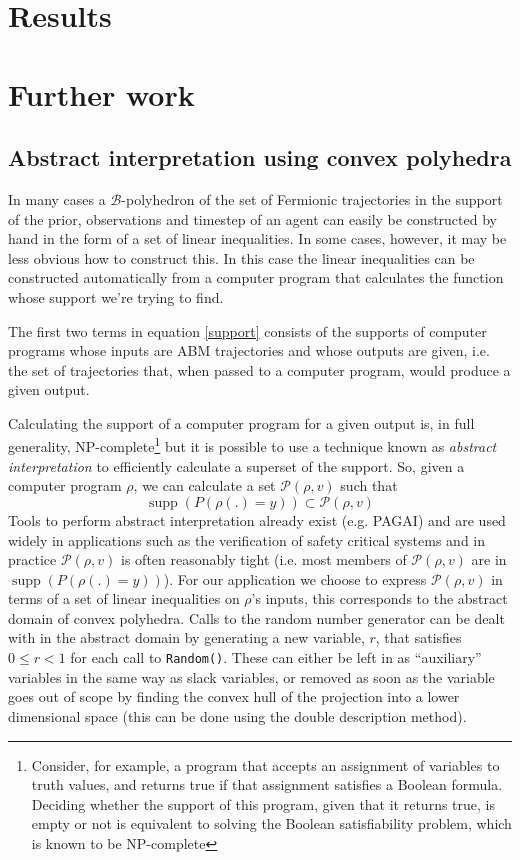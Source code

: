 \documentclass{article}
\DeclareMathOperator\supp{supp}
\begin{document}
\section{Results}

\section{Further work}
\subsection{Abstract interpretation using convex polyhedra}

In many cases a $\mathcal{B}$-polyhedron of the set of Fermionic trajectories in the support of the prior, observations and timestep of an agent can easily be constructed by hand in the form of a set of linear inequalities. In some cases, however, it may be less obvious how to construct this. In this case the linear inequalities can be constructed automatically from a computer program that calculates the function whose support we're trying to find.




The first two terms in equation \ref{support} consists of the supports of computer programs whose inputs are ABM trajectories and whose outputs are given, i.e. the set of trajectories that, when passed to a computer program, would produce a given output.

Calculating the support of a computer program for a given output is, in full generality, NP-complete\footnote{Consider, for example, a program that accepts an assignment of variables to truth values, and returns true if that assignment satisfies a Boolean formula. Deciding whether the support of this program, given that it returns true, is empty or not is equivalent to solving the Boolean satisfiability problem, which is known to be NP-complete\cite{cook1971complexity}} but it is possible to use a technique known as \textit{abstract interpretation}\cite{cousot1977abstract} to efficiently calculate a superset of the support. So, given a computer program $\rho$, we can calculate a set $\mathcal{P}(\rho, v)$ such that
\[
\supp(P(\rho(.)=y)) \subset \mathcal{P}(\rho, v)
\]
Tools to perform abstract interpretation already exist (e.g. PAGAI\cite{henry2012pagai}) and are used widely in applications such as the verification of safety critical systems\cite{blanchet2003static} and in practice $\mathcal{P}(\rho, v)$ is often reasonably tight (i.e. most members of $\mathcal{P}(\rho, v)$ are in $\supp(P(\rho(.)=y))$). For our application we choose to express $\mathcal{P}(\rho, v)$ in terms of a set of linear inequalities on $\rho$'s inputs, this corresponds to the abstract domain of convex polyhedra\cite{cousot1978automatic}\cite{becchi2018efficient}. Calls to the random number generator can be dealt with in the abstract domain by generating a new variable, $r$, that satisfies $0 \le r < 1$ for each call to \texttt{Random()}. These can either be left in as ``auxiliary'' variables in the same way as slack variables, or removed as soon as the variable goes out of scope by finding the convex hull of the projection into a lower dimensional space (this can be done using the double description method\cite{motzkin1953double}).
\end{document}
